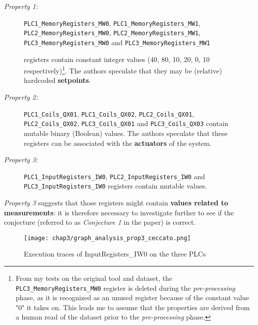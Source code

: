 \begin{description}
	\item[\colorbox{backcolourtext}{\textnormal{\textit{Property 1:}}}] \texttt{PLC1\_MemoryRegisters\_MW0},  \texttt{PLC1\_MemoryRegisters\_MW1}, \\ \texttt{PLC2\_MemoryRegisters\_MW0},  \texttt{PLC2\_MemoryRegisters\_MW1}, \\ 
	\texttt{PLC3\_MemoryRegisters\_MW0} and 
	\texttt{PLC3\_MemoryRegisters\_MW1}
 
	registers contain constant integer values (40, 80, 10, 20, 0, 10 respectively)\footnote{From my tests on the original tool and dataset, the \texttt{PLC3\_MemoryRegisters\_MW0} register is deleted during the \textit{pre-processing} phase, as it is recognized as an unused register because of the constant value "0" it takes on. This leads me to assume that the properties are derived from a human read of the dataset prior to the \textit{pre-processing} phase.}. The authors speculate that they may be (relative) hardcoded \textbf{setpoints}.
	
	\item[\colorbox{backcolourtext}{\textnormal{\textit{Property 2:}}}] \texttt{PLC1\_Coils\_QX01}, \texttt{PLC1\_Coils\_QX02}, \texttt{PLC2\_Coils\_QX01}, \\ \texttt{PLC2\_Coils\_QX02}, \texttt{PLC3\_Coils\_QX01} and \texttt{PLC3\_Coils\_QX03} contain mutable binary (Boolean) values.
	The authors speculate that these registers can be associated with the \textbf{actuators} of the system.
	
	\item[\colorbox{backcolourtext}{\textnormal{\textit{Property 3:}}}] \texttt{PLC1\_InputRegisters\_IW0},
	\texttt{PLC2\_InputRegisters\_IW0} and \\ \texttt{PLC3\_InputRegisters\_IW0} registers contain mutable values.
\end{description}

\textit{Property 3} suggests that those registers might contain \textbf{values related to measurements}: it is therefore necessary to investigate further to see if the conjecture (referred to as \textit{Conjecture 1} in the paper) is correct.

\begin{figure}[ht]
	\centering
	\texttt{[image: chap3/graph\_analysis\_prop3\_ceccato.png]}
	\caption{Execution traces of InputRegisters\_IW0 on the three PLCs}
	\label{fig:graph_analysis_prop3}
\end{figure}

